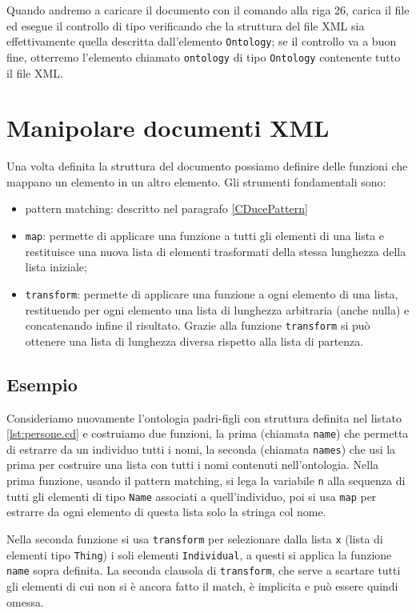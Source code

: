 Quando andremo a caricare il documento con il comando alla riga 26, \cduce carica il file ed esegue il controllo di tipo verificando che la struttura del file XML sia effettivamente quella descritta dall'elemento \verb|Ontology|; se il controllo va a buon fine, otterremo l'elemento chiamato \verb|ontology| di tipo \verb|Ontology| contenente tutto il file XML.
\section{Manipolare documenti XML}
Una volta definita la struttura del documento possiamo definire delle funzioni che mappano un elemento in un altro elemento. Gli strumenti fondamentali sono:
\begin{itemize}
	\item pattern matching: descritto nel paragrafo \ref{CDucePattern}
	\item \verb|map|\label{map}: permette di applicare una funzione a tutti gli elementi di una lista e restituisce una nuova lista di elementi trasformati della stessa lunghezza della lista iniziale;
	\item \verb|transform|: permette di applicare una funzione a ogni elemento di una lista, restituendo per ogni elemento una lista di lunghezza arbitraria (anche nulla) e concatenando infine il risultato. Grazie alla funzione \verb|transform| si può ottenere una lista di lunghezza diversa rispetto alla lista di partenza.
\end{itemize}

\subsection{Esempio}
Consideriamo nuovamente l'ontologia padri-figli con struttura definita nel listato \ref{lst:persone.cd} e costruiamo due funzioni, la prima (chiamata \verb|name|) che permetta di estrarre da un individuo tutti i nomi, la seconda (chiamata \verb|names|) che usi la prima per costruire una lista con tutti i nomi contenuti nell'ontologia.
Nella prima funzione, usando il pattern matching, si lega la variabile \verb|n| alla sequenza di tutti gli elementi di tipo \verb|Name| associati a quell'individuo, poi si usa \verb|map| per estrarre da ogni elemento di questa lista solo la stringa col nome.

Nella seconda funzione si usa \verb|transform| per selezionare dalla lista \verb|x| (lista di elementi tipo \verb|Thing|) i soli elementi \verb|Individual|, a questi si applica la funzione \verb|name| sopra definita. La seconda clausola di \verb|transform|, che serve a scartare tutti gli elementi di cui non si è ancora fatto il match, è implicita e può essere quindi omessa.

